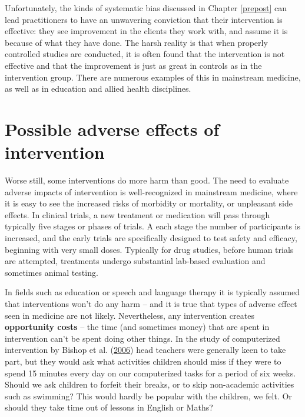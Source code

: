 \documentclass{krantz}
\begin{document}
Unfortunately, the kinds of systematic bias discussed in Chapter \ref{prepost} can lead practitioners to have an unwavering conviction that their intervention is effective: they see improvement in the clients they work with, and assume it is because of what they have done. The harsh reality is that when properly controlled studies are conducted, it is often found that the intervention is not effective and that the improvement is just as great in controls as in the intervention group. There are numerous examples of this in mainstream medicine, as well as in education and allied health disciplines.

\hypertarget{possible-adverse-effects-of-intervention}{%
\section{Possible adverse effects of intervention}\label{possible-adverse-effects-of-intervention}}

Worse still, some interventions do more harm than good. The need to evaluate adverse impacts of intervention is well-recognized in mainstream medicine, where it is easy to see the increased risks of morbidity or mortality, or unpleasant side effects. In clinical trials, a new treatment or medication will pass through typically five stages or phases of trials. A each stage the number of participants is increased, and the early trials are specifically designed to test safety and efficacy, beginning with very small doses. Typically for drug studies, before human trials are attempted, treatments undergo substantial lab-based evaluation and sometimes animal testing.

In fields such as education or speech and language therapy it is typically assumed that interventions won't do any harm -- and it is true that types of adverse effect seen in medicine are not likely. Nevertheless, any intervention creates \textbf{opportunity costs} -- the time (and sometimes money) that are spent in intervention can't be spent doing other things. In the study of computerized intervention by Bishop et al. (\protect\hyperlink{ref-bishop2006}{2006}) head teachers were generally keen to take part, but they would ask what activities children should miss if they were to spend 15 minutes every day on our computerized tasks for a period of six weeks. Should we ask children to forfeit their breaks, or to skip non-academic activities such as swimming? This would hardly be popular with the children, we felt. Or should they take time out of lessons in English or Maths?
\end{document}
